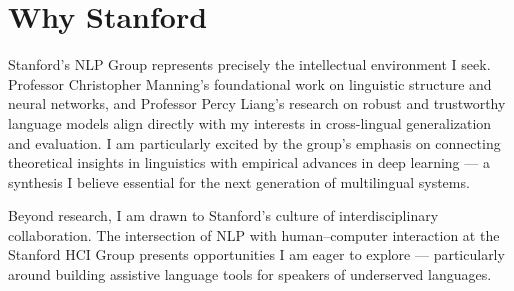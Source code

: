   \section{Why Stanford}

  Stanford's NLP Group represents precisely the intellectual environment I seek. Professor Christopher Manning's foundational work on linguistic structure and neural networks, and Professor Percy Liang's research on robust and trustworthy language models align directly with my interests in cross-lingual generalization and evaluation. I am particularly excited by the group's emphasis on connecting theoretical insights in linguistics with empirical advances in deep learning — a synthesis I believe essential for the next generation of multilingual systems.

  Beyond research, I am drawn to Stanford's culture of interdisciplinary collaboration. The intersection of NLP with human--computer interaction at the Stanford HCI Group presents opportunities I am eager to explore — particularly around building assistive language tools for speakers of underserved languages.
